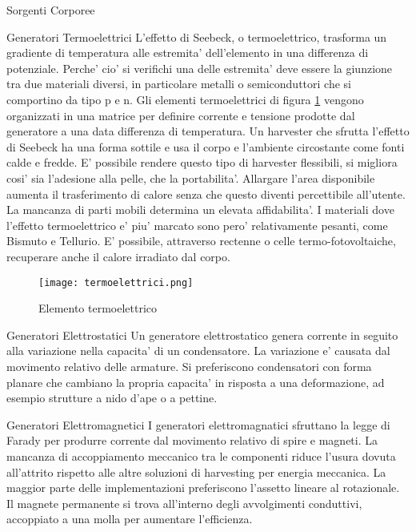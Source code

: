 \begin{section}{Sorgenti Corporee}
   \begin{subsection}{Generatori Termoelettrici}
    L'effetto di Seebeck, o termoelettrico, trasforma un gradiente di temperatura alle estremita' dell'elemento in una differenza di potenziale. Perche' cio' si verifichi una delle estremita' deve essere la giunzione tra due materiali diversi, in particolare metalli o semiconduttori che si comportino da tipo p e n. Gli elementi termoelettrici di figura \ref{fig:termoelettrici} vengono organizzati in una matrice per definire corrente e tensione prodotte dal generatore a una data differenza di temperatura. Un harvester che sfrutta l'effetto di Seebeck ha una forma sottile e usa il corpo e l'ambiente circostante come fonti calde e fredde. E' possibile rendere questo tipo di harvester flessibili, si migliora cosi' sia l'adesione alla pelle, che la portabilita'. Allargare l'area disponibile aumenta il trasferimento di calore senza che questo diventi percettibile all'utente. La mancanza di parti mobili determina un elevata affidabilita'. I materiali dove l'effetto termoelettrico e' piu' marcato sono pero' relativamente pesanti, come Bismuto e Tellurio. E' possibile, attraverso rectenne o celle termo-fotovoltaiche, recuperare anche il calore irradiato dal corpo.
    \begin{figure}[H]
        \texttt{[image: termoelettrici.png]}
        \centering
        \caption{Elemento termoelettrico}
        \label{fig:termoelettrici}
    \end{figure}
   \end{subsection}

   \begin{subsection}{Generatori Elettrostatici}
    Un generatore elettrostatico genera corrente in seguito alla variazione nella capacita' di un condensatore. La variazione e' causata dal movimento relativo delle armature. Si preferiscono condensatori con forma planare che cambiano la propria capacita' in risposta a una deformazione, ad esempio strutture a nido d'ape o a pettine.
   \end{subsection}

   \begin{subsection}{Generatori Elettromagnetici}
    I generatori elettromagnatici sfruttano la legge di Farady per produrre corrente dal movimento relativo di spire e magneti. La mancanza di accoppiamento meccanico tra le componenti riduce l'usura dovuta all'attrito rispetto alle altre soluzioni di harvesting per energia meccanica. La maggior parte delle implementazioni preferiscono l'assetto lineare al rotazionale. Il magnete permanente si trova all'interno degli avvolgimenti conduttivi, accoppiato a una molla per aumentare l'efficienza.
   \end{subsection}
   

\end{section}
